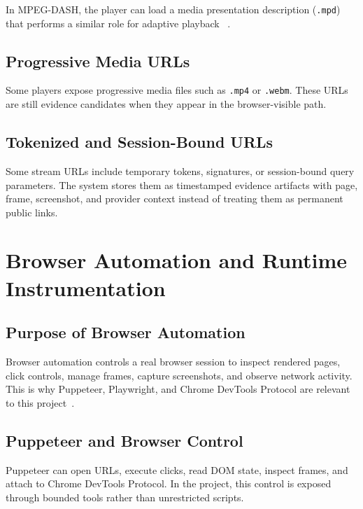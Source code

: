 In MPEG-DASH, the player can load a media presentation description
(\texttt{.mpd}) that performs a similar role for adaptive playback
~\cite{dash-standard}.

\subsection{Progressive Media URLs}

Some players expose progressive media files such as \texttt{.mp4} or
\texttt{.webm}. These URLs are still evidence candidates when they appear in
the browser-visible path.

\subsection{Tokenized and Session-Bound URLs}

Some stream URLs include temporary tokens, signatures, or session-bound query
parameters. The system stores them as timestamped evidence artifacts with page,
frame, screenshot, and provider context instead of treating them as permanent
public links.




\section{Browser Automation and Runtime Instrumentation}

\subsection{Purpose of Browser Automation}

Browser automation controls a real browser session to inspect rendered pages,
click controls, manage frames, capture screenshots, and observe network
activity. This is why Puppeteer, Playwright, and Chrome DevTools Protocol are
relevant to this project~\cite{puppeteer,playwright,cdp}.

\subsection{Puppeteer and Browser Control}

Puppeteer can open URLs, execute clicks, read DOM state, inspect frames, and
attach to Chrome DevTools Protocol. In the project, this control is exposed
through bounded tools rather than unrestricted scripts.

